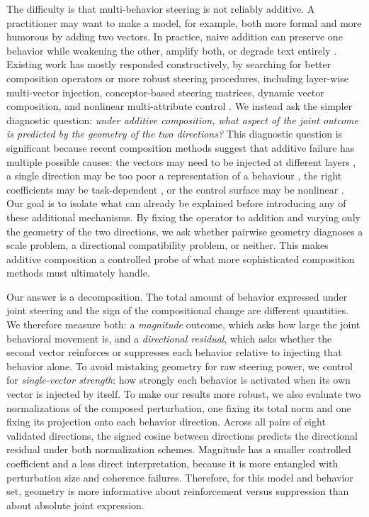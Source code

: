 \documentclass{article}
\begin{document}
The difficulty is that multi-behavior steering is not reliably additive. A practitioner may want to
make a model, for example, both more formal and more humorous by adding two vectors. In practice,
naive addition can preserve one behavior while weakening the other, amplify both, or degrade text
entirely \citep{vanderweij2024extending}. Existing work has mostly responded constructively, by
searching for better composition operators or more robust steering procedures, including layer-wise
multi-vector injection, conceptor-based steering matrices, dynamic vector composition, and nonlinear
multi-attribute control \citep{vanderweij2024extending,postmus2024conceptorsteering,han2026steer2adapt,oozeer2025beyond}. We instead ask the
simpler diagnostic question: \emph{under additive composition, what aspect of the joint outcome is
predicted by the geometry of the two directions?} This diagnostic question is significant because recent composition methods suggest that additive
failure has multiple possible causes: the vectors may need to be injected at different layers
\citep{vanderweij2024extending}, a single direction may be too poor a representation of a behaviour
\citep{postmus2024conceptorsteering}, the right coefficients may be task-dependent
\citep{han2026steer2adapt}, or the control surface may be nonlinear
\citep{oozeer2025beyond}. Our goal is to isolate what can already be explained before introducing
any of these additional mechanisms. By fixing the operator to addition and varying only the geometry
of the two directions, we ask whether pairwise geometry diagnoses a scale problem, a directional
compatibility problem, or neither. This makes additive composition a
controlled probe of what more sophisticated composition methods must ultimately handle.

Our answer is a decomposition. The total amount of behavior expressed under joint steering and the
sign of the compositional change are different quantities. We therefore measure both: a
\emph{magnitude} outcome, which asks how large the joint behavioral movement is, and a
\emph{directional residual}, which asks whether the second vector reinforces or suppresses each
behavior relative to injecting that behavior alone. To avoid mistaking geometry for raw steering
power, we control for \emph{single-vector strength}: how strongly each behavior is activated when its
own vector is injected by itself. To make our results more robust, we also evaluate two normalizations of the composed perturbation,
one fixing its total norm and one fixing its projection onto each behavior direction. Across all
pairs of eight validated directions, the signed cosine between directions predicts the directional
residual under both normalization schemes. Magnitude has a smaller controlled coefficient and a less
direct interpretation, because it is more entangled with perturbation size and coherence failures.
Therefore, for this model and behavior set, geometry is more informative
about reinforcement versus suppression than about absolute joint expression.
\end{document}

